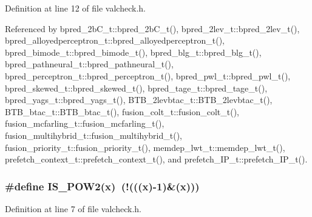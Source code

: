Definition at line 12 of file valcheck.h.

Referenced by bpred\_\-2bC\_\-t::bpred\_\-2bC\_\-t(), bpred\_\-2lev\_\-t::bpred\_\-2lev\_\-t(), bpred\_\-alloyedperceptron\_\-t::bpred\_\-alloyedperceptron\_\-t(), bpred\_\-bimode\_\-t::bpred\_\-bimode\_\-t(), bpred\_\-blg\_\-t::bpred\_\-blg\_\-t(), bpred\_\-pathneural\_\-t::bpred\_\-pathneural\_\-t(), bpred\_\-perceptron\_\-t::bpred\_\-perceptron\_\-t(), bpred\_\-pwl\_\-t::bpred\_\-pwl\_\-t(), bpred\_\-skewed\_\-t::bpred\_\-skewed\_\-t(), bpred\_\-tage\_\-t::bpred\_\-tage\_\-t(), bpred\_\-yags\_\-t::bpred\_\-yags\_\-t(), BTB\_\-2levbtac\_\-t::BTB\_\-2levbtac\_\-t(), BTB\_\-btac\_\-t::BTB\_\-btac\_\-t(), fusion\_\-colt\_\-t::fusion\_\-colt\_\-t(), fusion\_\-mcfarling\_\-t::fusion\_\-mcfarling\_\-t(), fusion\_\-multihybrid\_\-t::fusion\_\-multihybrid\_\-t(), fusion\_\-priority\_\-t::fusion\_\-priority\_\-t(), memdep\_\-lwt\_\-t::memdep\_\-lwt\_\-t(), prefetch\_\-context\_\-t::prefetch\_\-context\_\-t(), and prefetch\_\-IP\_\-t::prefetch\_\-IP\_\-t().
\subsubsection[{IS\_\-POW2}]{\setlength{\rightskip}{0pt plus 5cm}\#define IS\_\-POW2(x)~(!(((x)-1)\&(x)))}\label{valcheck_8h_fd922d5a863aa3844c5390af42d97638}




Definition at line 7 of file valcheck.h.